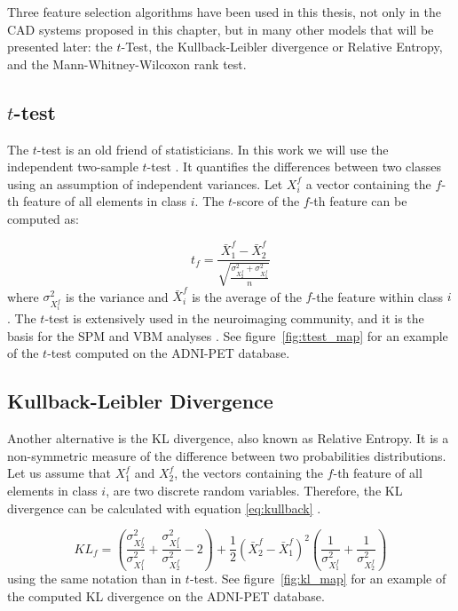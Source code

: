 Three feature selection algorithms have been used in this thesis, not only in the \ac{CAD} systems proposed in this chapter, but in many other models that will be presented later: the $t$-Test, the Kullback-Leibler divergence or Relative Entropy, and the Mann-Whitney-Wilcoxon rank test. 

\subsection{$t$-test}
The $t$-test is an old friend of statisticians. In this work we will use the independent two-sample $t$-test \cite{Fay10}. It quantifies the differences between two classes using an assumption of independent variances. Let $X_i^f$ a vector containing the $f$-th feature of all elements in class $i$. The $t$-score of the $f$-th feature can be computed as:

\begin{equation}
t_f = \frac{\bar{X}_1^f - \bar{X}_2^f}{\sqrt{\frac{\sigma_{X_2^f}^2+\sigma_{X_1^f}^2}{n}}}
\end{equation}
where $\sigma_{X_i^f}^2$ is the variance and $\bar{X}_i^f$ is the average of the $f$-the feature within class $i$. The $t$-test is extensively used in the neuroimaging community, and it is the basis for the \ac{SPM} and \ac{VBM} analyses \cite{spm_book}. See figure~\ref{fig:ttest_map} for an example of the $t$-test computed on the ADNI-PET database.

\subsection{Kullback-Leibler Divergence} 
Another alternative is the \acf{KL} divergence, also known as Relative Entropy. It is a non-symmetric measure of the difference between two probabilities distributions. Let us assume that $X_1^f$ and $X_2^f$, the vectors containing the $f$-th feature of all elements in class $i$, are two discrete random variables. Therefore, the \ac{KL} divergence can be calculated with equation \ref{eq:kullback} \cite{Theodoridis1999}.

\begin{equation}\label{eq:kullback}
KL_f = \left(\frac{\sigma_{X_2^f}^2}{\sigma_{X_1^f}^2} +\frac{\sigma_{X_1^f}^2}{\sigma_{X_2^f}^2} -2 \right) + \frac{1}{2}\left(\bar{X}_2^f-\bar{X}_1^f\right)^2\left(\frac{1}{\sigma_{X_1^f}^2} + \frac{1}{\sigma_{X_2^f}^2}\right)
\end{equation}
using the same notation than in $t$-test. See figure~\ref{fig:kl_map} for an example of the computed \ac{KL} divergence on the ADNI-PET database.

